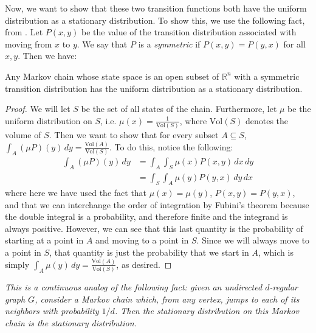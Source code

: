 \documentclass[11pt]{article}
\begin{document}
Now, we want to show that these two transition functions both have the uniform distribution as a stationary distribution. To show this, we use the following fact, from \cite{Smith}. Let $P(x,y)$ be the value of the transition distribution associated with moving from $x$ to $y$. We say that $P$ is a \emph{symmetric} if $P(x,y) = P(y,x)$ for all $x,y$. Then we have:

\begin{theorem}
Any Markov chain whose state space is an open subset of $\mathbb{R}^n$ with a symmetric transition distribution has the uniform distribution as a stationary distribution.
\label{symmetric}
\end{theorem}
\begin{proof}
We will let $S$ be the set of all states of the chain. Furthermore, let $\mu$ be the uniform distribution on $S$, i.e. $\mu(x) = \frac{1}{\text{Vol}(S)}$, where $\text{Vol}(S)$ denotes the volume of $S$. Then we want to show that for every subset $A \subseteq S$, $\int_A (\mu P)(y)\, dy = \frac{\text{Vol}(A)}{\text{Vol}(S)}$. To do this, notice the following:
\begin{align*}
\int_A (\mu P)(y)\, dy &= \int_A \int_S \mu(x)P(x,y)\, dx\, dy \\
&= \int_S \int_A \mu(y)P(y,x)\, dy\, dx
\end{align*}
where here we have used the fact that $\mu(x) = \mu(y)$, $P(x,y) = P(y,x)$, and that we can interchange the order of integration by Fubini's theorem because the double integral is a probability, and therefore finite and the integrand is always positive. However, we can see that this last quantity is the probability of starting at a point in $A$ and moving to a point in $S$. Since we will always move to a point in $S$, that quantity is just the probability that we start in $A$, which is simply $\int_A \mu(y)\, dy = \frac{\text{Vol}(A)}{\text{Vol}(S)}$, as desired.
\end{proof}
\begin{remark} 
\emph{This is a continuous analog of the following fact: given an undirected $d$-regular graph $G$, consider a Markov chain which, from any vertex, jumps to each of its neighbors with probability $1/d$. Then the stationary distribution on this Markov chain is the stationary distribution.}
\end{remark}
\end{document}
